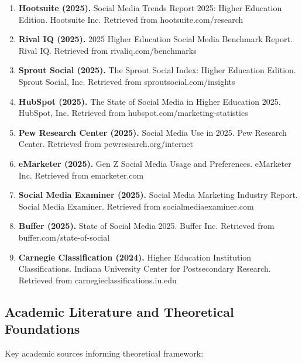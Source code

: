 \documentclass[12pt]{report}
\begin{document}
\begin{enumerate}
\item \textbf{Hootsuite (2025).} Social Media Trends Report 2025: Higher Education Edition. Hootsuite Inc. Retrieved from hootsuite.com/research

\item \textbf{Rival IQ (2025).} 2025 Higher Education Social Media Benchmark Report. Rival IQ. Retrieved from rivaliq.com/benchmarks

\item \textbf{Sprout Social (2025).} The Sprout Social Index: Higher Education Edition. Sprout Social, Inc. Retrieved from sproutsocial.com/insights

\item \textbf{HubSpot (2025).} The State of Social Media in Higher Education 2025. HubSpot, Inc. Retrieved from hubspot.com/marketing-statistics

\item \textbf{Pew Research Center (2025).} Social Media Use in 2025. Pew Research Center. Retrieved from pewresearch.org/internet

\item \textbf{eMarketer (2025).} Gen Z Social Media Usage and Preferences. eMarketer Inc. Retrieved from emarketer.com

\item \textbf{Social Media Examiner (2025).} Social Media Marketing Industry Report. Social Media Examiner. Retrieved from socialmediaexaminer.com

\item \textbf{Buffer (2025).} State of Social Media 2025. Buffer Inc. Retrieved from buffer.com/state-of-social

\item \textbf{Carnegie Classification (2024).} Higher Education Institution Classifications. Indiana University Center for Postsecondary Research. Retrieved from carnegieclassifications.iu.edu
\end{enumerate}

\subsection{Academic Literature and Theoretical Foundations}

Key academic sources informing theoretical framework:
\end{document}
